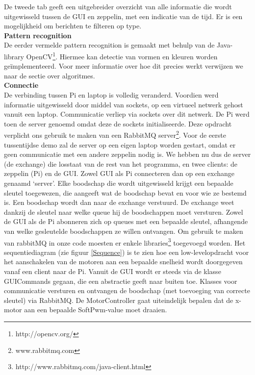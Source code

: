 \documentclass[tt]{penoverslag}
\begin{document}
De tweede tab geeft een uitgebreider overzicht van alle informatie die wordt uitgewisseld tussen de GUI en zeppelin, met een indicatie van de tijd. Er is een mogelijkheid om berichten te filteren op type. \\



\textbf{Pattern recognition}\\
De eerder vermelde pattern recognition is gemaakt met behulp van de Java-library OpenCV\footnote{http://opencv.org/}. Hiermee kan detectie van vormen en kleuren worden ge\"{i}mplementeerd. Voor meer informatie over hoe dit precies werkt verwijzen we naar de sectie over algoritmes. \\

\textbf{Connectie}\\
De verbinding tussen Pi en laptop is volledig veranderd. Voordien werd informatie uitgewisseld door middel van sockets, op een virtueel netwerk gehost vanuit een laptop. Communicatie verliep via sockets over dit netwerk. De Pi werd toen de server genoemd omdat deze de sockets initialiseerde. Deze opdracht verplicht ons gebruik te maken van een RabbitMQ server\footnote{www.rabbitmq.com}. Voor de eerste tussentijdse demo zal de server op een eigen laptop worden gestart, omdat er geen communicatie met een andere zeppelin nodig is. We hebben nu dus de server (de exchange) die losstaat van de rest van het programma, en twee clients: de zeppelin (Pi) en de GUI. Zowel GUI als Pi connecteren dan op een exchange genaamd ‘server’. Elke boodschap die wordt uitgewisseld krijgt een bepaalde sleutel toegewezen, die aangeeft wat de boodschap bevat en voor wie ze bestemd is. Een boodschap wordt dan naar de exchange verstuurd. De exchange weet dankzij de sleutel naar welke queue hij de boodschappen moet versturen. Zowel de GUI als de Pi abonneren zich op queues met een bepaalde sleutel, afhangende van welke gesleutelde boodschappen ze willen ontvangen. Om gebruik te maken van rabbitMQ in onze code moesten er enkele libraries\footnote{http://www.rabbitmq.com/java-client.html} toegevoegd worden. Het sequentiediagram (zie figuur \ref{Sequence}) is te zien hoe een low-levelopdracht voor het aanschakelen van de motoren aan een bepaalde snelheid wordt doorgegeven vanaf een client naar de Pi. Vanuit de GUI wordt er steeds via de klasse GUICommands gegaan, die een abstractie geeft naar buiten toe. Klasses voor communicatie versturen en ontvangen de boodschap (met toevoeging van correcte sleutel) via RabbitMQ. De MotorController gaat uiteindelijk bepalen dat de x-motor aan een bepaalde SoftPwm-value moet draaien.
\\
\end{document}
